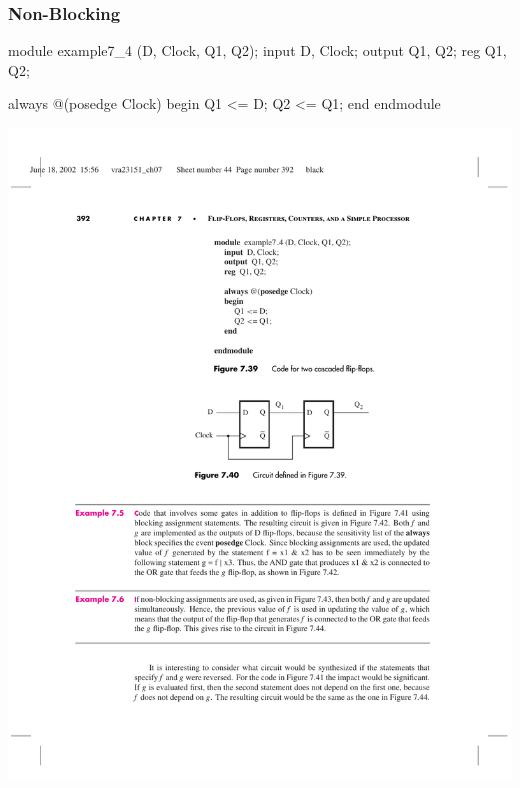 \begin{frame}[fragile]
	\frametitle{Non-Blocking}
	\begin{verilogcode}
module example7_4 (D, Clock, Q1, Q2); 
  input D, Clock;
  output Q1, Q2;
  reg Q1, Q2;

  always @(posedge Clock) 
  begin
    Q1 <= D;
    Q2 <= Q1; 
  end
endmodule
	\end{verilogcode}
    \includegraphics[scale=.7]{figs/VerilogFig7_40}
\end{frame}

